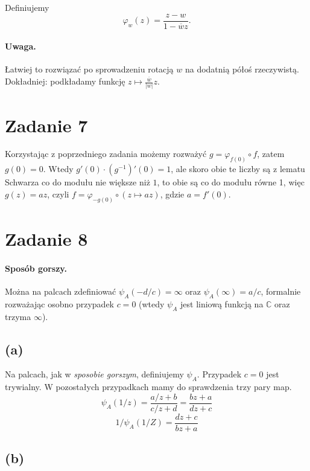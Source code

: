 Definiujemy
\[ 
    \varphi_w(z) = \frac{z - w}{1 - \overline{w}z}.
\]


\paragraph{Uwaga.} Łatwiej to rozwiązać po sprowadzeniu rotacją \( w \) na dodatnią półoś rzeczywistą. Dokładniej: podkładamy funkcję \( z \mapsto \frac{\overline{w}}{ \left| w \right|  }z \).

\section*{Zadanie 7}

Korzystając z poprzedniego zadania możemy rozważyć \( g = \varphi_{f(0)} \circ f \), zatem \( g(0) = 0 \). Wtedy \( g'(0) \cdot (g^{-1})'(0) = 1 \), ale skoro obie te liczby są z lematu Schwarza co do modułu nie większe niż \( 1 \), to obie są co do modułu równe 1, więc \( g(z) = az \), czyli \( f = \varphi_{-g(0)} \circ (z \mapsto az) \), gdzie \( a = f'(0) \).

\section*{Zadanie 8}

\paragraph{Sposób gorszy.} Można na palcach zdefiniować \( \psi_A(-d/c) = \infty \) oraz \( \psi_A(\infty) = a/c \), formalnie rozważając osobno przypadek \( c = 0 \) (wtedy \( \psi_A \) jest liniową funkcją na \( \mathbb{C} \) oraz trzyma \( \infty \)).

\subsection*{(a)}
Na palcach, jak w \textit{sposobie gorszym}, definiujemy \( \psi_A \). Przypadek \( c = 0 \) jest trywialny. W pozostałych przypadkach mamy do sprawdzenia trzy pary map.
\[ 
    \psi_A(1/z) = \frac{a/z + b}{c/z + d} = \frac{bz + a}{dz + c} 
\]
\[ 
    1/\psi_A(1/Z) =  \frac{dz + c}{bz + a}
\]

\subsection*{(b)}

